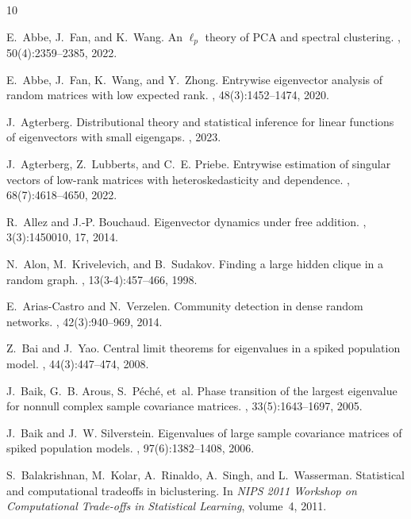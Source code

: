 \documentclass[reqno]{amsart}
\theoremstyle{plain}
\theoremstyle{definition}
\begin{document}
\begin{thebibliography}{10}

E.~Abbe, J.~Fan, and K.~Wang.
\newblock An $\ell_p$ theory of {PCA} and spectral clustering.
, 50(4):2359--2385, 2022.

E.~Abbe, J.~Fan, K.~Wang, and Y.~Zhong.
\newblock Entrywise eigenvector analysis of random matrices with low expected
  rank.
, 48(3):1452--1474, 2020.

J.~Agterberg.
\newblock Distributional theory and statistical inference for linear functions
  of eigenvectors with small eigengaps.
, 2023.

J.~Agterberg, Z.~Lubberts, and C.~E. Priebe.
\newblock Entrywise estimation of singular vectors of low-rank matrices with
  heteroskedasticity and dependence.
, 68(7):4618--4650, 2022.

R.~Allez and J.-P. Bouchaud.
\newblock Eigenvector dynamics under free addition.
, 3(3):1450010, 17, 2014.

N.~Alon, M.~Krivelevich, and B.~Sudakov.
\newblock Finding a large hidden clique in a random graph.
, 13(3-4):457--466, 1998.

E.~Arias-Castro and N.~Verzelen.
\newblock Community detection in dense random networks.
, 42(3):940--969, 2014.

Z.~Bai and J.~Yao.
\newblock Central limit theorems for eigenvalues in a spiked population model.
, 44(3):447--474,
  2008.

J.~Baik, G.~B. Arous, S.~P{\'e}ch{\'e}, et~al.
\newblock Phase transition of the largest eigenvalue for nonnull complex sample
  covariance matrices.
, 33(5):1643--1697, 2005.

J.~Baik and J.~W. Silverstein.
\newblock Eigenvalues of large sample covariance matrices of spiked population
  models.
, 97(6):1382--1408, 2006.

S.~Balakrishnan, M.~Kolar, A.~Rinaldo, A.~Singh, and L.~Wasserman.
\newblock Statistical and computational tradeoffs in biclustering.
\newblock In {\em NIPS 2011 Workshop on Computational Trade-offs in Statistical
  Learning}, volume~4, 2011.


\end{thebibliography}
\end{document}
